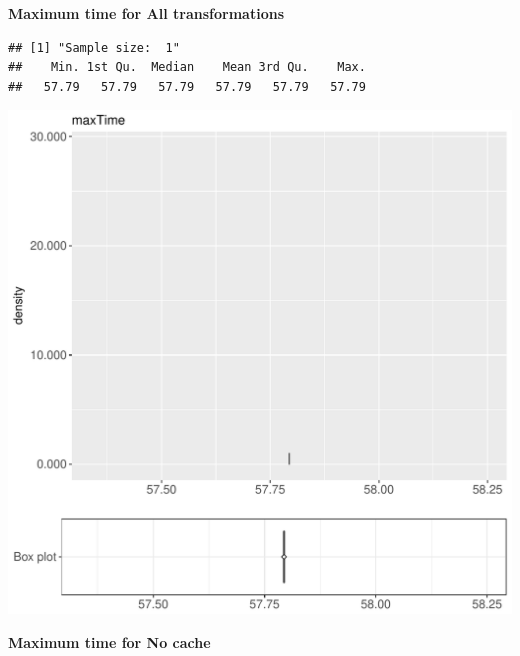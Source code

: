 \documentclass{article}\usepackage[]{graphicx}\usepackage[]{color}
\makeatletter
\def\maxwidth{ %
  \ifdim\Gin@nat@width>\linewidth
    \linewidth
  \else
    \Gin@nat@width
  \fi
}
\newenvironment{kframe}{%
 \def\at@end@of@kframe{}%
 \ifinner\ifhmode%
  \def\at@end@of@kframe{\end{minipage}}%
  \begin{minipage}{\columnwidth}%
 \fi\fi%
 \def\FrameCommand##1{\hskip\@totalleftmargin \hskip-\fboxsep
 \colorbox{shadecolor}{##1}\hskip-\fboxsep
     \hskip-\linewidth \hskip-\@totalleftmargin \hskip\columnwidth}%
 \MakeFramed {\advance\hsize-\width
   \@totalleftmargin\z@ \linewidth\hsize
   \@setminipage}}%
 {\par\unskip\endMakeFramed%
 \at@end@of@kframe}
\newenvironment{knitrout}{}{} %
\makeatother
\begin{document}
 \textbf{Maximum time for All transformations}
\begin{knitrout}
\color{fgcolor}\begin{kframe}
\begin{verbatim}
## [1] "Sample size:  1"
##    Min. 1st Qu.  Median    Mean 3rd Qu.    Max. 
##   57.79   57.79   57.79   57.79   57.79   57.79
\end{verbatim}


{\ttfamily\noindent\bfseries{}}\end{kframe}
\includegraphics[width=\maxwidth]{figure/RH2_cashew_big-1} 

\end{knitrout}
 \textbf{Maximum time for No cache}
\end{document}
